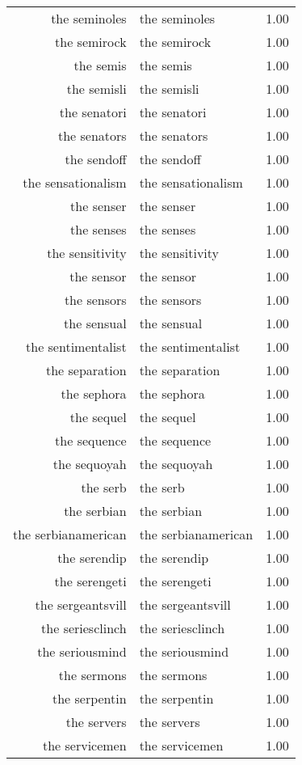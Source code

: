 \begin{table}[ht]
\begin{tabular}{rlr}
  the seminoles & the seminoles & 1.00 \\ 
  the semirock & the semirock & 1.00 \\ 
  the semis & the semis & 1.00 \\ 
  the semisli & the semisli & 1.00 \\ 
  the senatori & the senatori & 1.00 \\ 
  the senators & the senators & 1.00 \\ 
  the sendoff & the sendoff & 1.00 \\ 
  the sensationalism & the sensationalism & 1.00 \\ 
  the senser & the senser & 1.00 \\ 
  the senses & the senses & 1.00 \\ 
  the sensitivity & the sensitivity & 1.00 \\ 
  the sensor & the sensor & 1.00 \\ 
  the sensors & the sensors & 1.00 \\ 
  the sensual & the sensual & 1.00 \\ 
  the sentimentalist & the sentimentalist & 1.00 \\ 
  the separation & the separation & 1.00 \\ 
  the sephora & the sephora & 1.00 \\ 
  the sequel & the sequel & 1.00 \\ 
  the sequence & the sequence & 1.00 \\ 
  the sequoyah & the sequoyah & 1.00 \\ 
  the serb & the serb & 1.00 \\ 
  the serbian & the serbian & 1.00 \\ 
  the serbianamerican & the serbianamerican & 1.00 \\ 
  the serendip & the serendip & 1.00 \\ 
  the serengeti & the serengeti & 1.00 \\ 
  the sergeantsvill & the sergeantsvill & 1.00 \\ 
  the seriesclinch & the seriesclinch & 1.00 \\ 
  the seriousmind & the seriousmind & 1.00 \\ 
  the sermons & the sermons & 1.00 \\ 
  the serpentin & the serpentin & 1.00 \\ 
  the servers & the servers & 1.00 \\ 
  the servicemen & the servicemen & 1.00 \\ 

\end{tabular}
\end{table}
